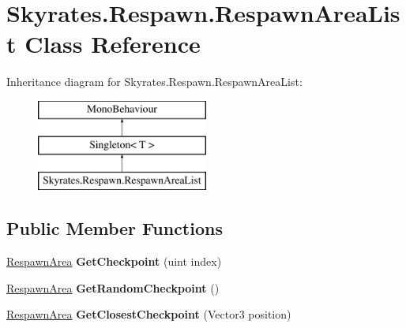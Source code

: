 \hypertarget{class_skyrates_1_1_respawn_1_1_respawn_area_list}{\section{Skyrates.\-Respawn.\-Respawn\-Area\-List Class Reference}
\label{class_skyrates_1_1_respawn_1_1_respawn_area_list}
}
Inheritance diagram for Skyrates.\-Respawn.\-Respawn\-Area\-List\-:\begin{figure}[H]
\begin{center}
\leavevmode
\includegraphics[height=3.000000cm]{class_skyrates_1_1_respawn_1_1_respawn_area_list}
\end{center}
\end{figure}
\subsection*{Public Member Functions}
\begin{DoxyCompactItemize}
\item 
\hypertarget{class_skyrates_1_1_respawn_1_1_respawn_area_list_a2295c038fa1567897acd8749a660cb7d}{\hyperlink{class_skyrates_1_1_respawn_1_1_respawn_area}{Respawn\-Area} {\bfseries Get\-Checkpoint} (uint index)}\label{class_skyrates_1_1_respawn_1_1_respawn_area_list_a2295c038fa1567897acd8749a660cb7d}

\item 
\hypertarget{class_skyrates_1_1_respawn_1_1_respawn_area_list_ae5f6e648f4a30fefcf070733dcc293d5}{\hyperlink{class_skyrates_1_1_respawn_1_1_respawn_area}{Respawn\-Area} {\bfseries Get\-Random\-Checkpoint} ()}\label{class_skyrates_1_1_respawn_1_1_respawn_area_list_ae5f6e648f4a30fefcf070733dcc293d5}

\item 
\hypertarget{class_skyrates_1_1_respawn_1_1_respawn_area_list_a911ab95b0b24e2be46324ffd03a05a2e}{\hyperlink{class_skyrates_1_1_respawn_1_1_respawn_area}{Respawn\-Area} {\bfseries Get\-Closest\-Checkpoint} (Vector3 position)}\label{class_skyrates_1_1_respawn_1_1_respawn_area_list_a911ab95b0b24e2be46324ffd03a05a2e}

\end{DoxyCompactItemize}
